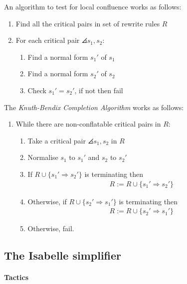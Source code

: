\documentclass{article}
\begin{document}
\begin{theorem}
	An algorithm to test for local confluence works as follows:
	\begin{enumerate}
		\item Find all the critical pairs in set of rewrite rules $R$
		\item For each critical pair $\angles{s_1, s_2}$: \begin{enumerate}
			      \item Find a normal form $s_1'$ of $s_1$
			      \item Find a normal form $s_2'$ of $s_2$
			      \item Check $s_1'=s_2'$, if not then fail
		      \end{enumerate}
	\end{enumerate}
\end{theorem}

\begin{theorem}
	The \emph{Knuth-Bendix Completion Algorithm} works as follows:
	\begin{enumerate}
		\item While there are non-conflatable critical pairs in $R$: \begin{enumerate}
			      \item Take a critical pair $\angles{s_1, s_2}$ in $R$
			      \item Normalise $s_1$ to $s_1'$ and $s_2$ to $s_2'$
			      \item If $R\cup\{s_1'\Rightarrow s_2'\}$ is terminating then \begin{align*}
				            R := R \cup \{s_1'\Rightarrow s_2'\}
			            \end{align*}
			      \item Otherwise, if $R\cup\{s_2'\Rightarrow s_1'\}$ is terminating then \begin{align*}
				            R := R \cup \{s_2' \Rightarrow s_1'\}
			            \end{align*}
			      \item Otherwise, fail.
		      \end{enumerate}
	\end{enumerate}
\end{theorem}

\subsection{The Isabelle simplifier}

\paragraph*{Tactics}
\end{document}
